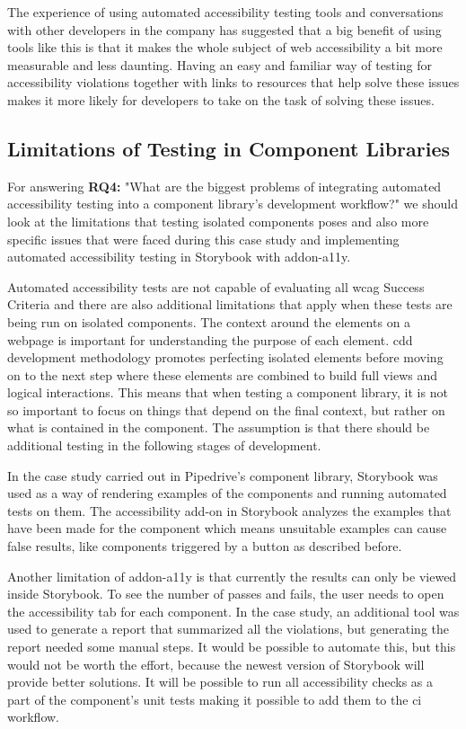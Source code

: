 \documentclass{master_thesis}
\begin{document}
The experience of using automated accessibility testing tools and conversations with other developers in the company has suggested that a big benefit of using tools like this is that it makes the whole subject of web accessibility a bit more measurable and less daunting. Having an easy and familiar way of testing for accessibility violations together with links to resources that help solve these issues makes it more likely for developers to take on the task of solving these issues.

\subsection{Limitations of Testing in Component Libraries}

For answering \textbf{RQ4:} "What are the biggest problems of integrating automated accessibility testing into a component library's development workflow?" we should look at the limitations that testing isolated components poses and also more specific issues that were faced during this case study and implementing automated accessibility testing in Storybook with addon-a11y.

Automated accessibility tests are not capable of evaluating all \ac{wcag} Success Criteria and there are also additional limitations that apply when these tests are being run on isolated components. The context around the elements on a webpage is important for understanding the purpose of each element. \ac{cdd} development methodology promotes perfecting isolated elements before moving on to the next step where these elements are combined to build full views and logical interactions. This means that when testing a component library, it is not so important to focus on things that depend on the final context, but rather on what is contained in the component. The assumption is that there should be additional testing in the following stages of development.

In the case study carried out in Pipedrive's component library, Storybook was used as a way of rendering examples of the components and running automated tests on them. The accessibility add-on in Storybook analyzes the examples that have been made for the component which means unsuitable examples can cause false results, like components triggered by a button as described before.

Another limitation of addon-a11y is that currently the results can only be viewed inside Storybook. To see the number of passes and fails, the user needs to open the accessibility tab for each component. In the case study, an additional tool was used to generate a report that summarized all the violations, but generating the report needed some manual steps. It would be possible to automate this, but this would not be worth the effort, because the newest version of Storybook will provide better solutions. It will be possible to run all accessibility checks as a part of the component's unit tests making it possible to add them to the \ac{ci} workflow.
\end{document}
